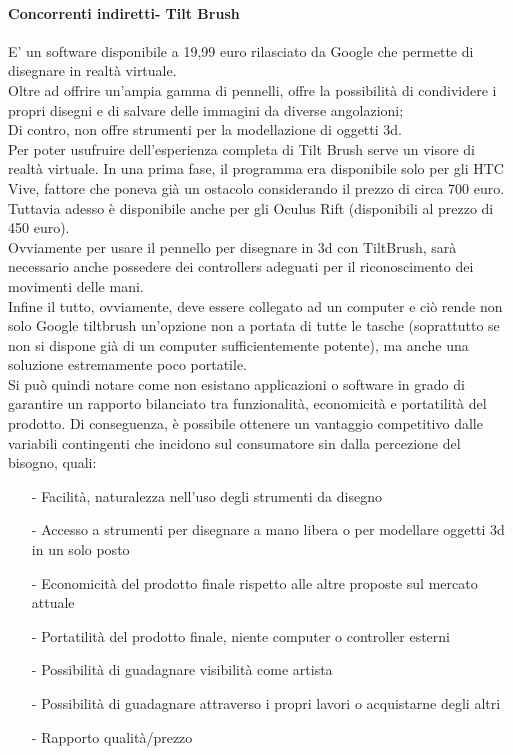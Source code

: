 \documentclass[11pt,fleqn]{book} %
\begin{document}
\paragraph{Concorrenti indiretti- Tilt Brush}
E' un software disponibile a 19,99 euro rilasciato da Google che permette di disegnare in realtà virtuale. \\
Oltre ad offrire un'ampia gamma di pennelli, offre la possibilità di condividere i propri disegni e di salvare delle immagini da diverse angolazioni; \\Di contro, non offre strumenti per la modellazione di oggetti 3d.\\
Per poter usufruire dell'esperienza completa di Tilt Brush serve un visore di realtà virtuale. In una prima fase, il programma era disponibile solo per gli HTC Vive, fattore che poneva già un ostacolo considerando il prezzo di circa 700  euro. Tuttavia adesso è disponibile anche per gli Oculus Rift (disponibili al prezzo di 450 euro). \\
Ovviamente per usare il pennello per disegnare in 3d con TiltBrush, sarà necessario anche possedere dei controllers adeguati per il riconoscimento dei movimenti delle mani.\\
Infine il tutto, ovviamente, deve essere collegato ad un computer e ciò rende non solo Google tiltbrush un'opzione non a portata di tutte le tasche (soprattutto se non si dispone già di un computer sufficientemente potente), ma anche una soluzione estremamente poco portatile.\\

Si può quindi notare come non esistano applicazioni o software in grado di garantire un rapporto bilanciato tra funzionalità, economicità e portatilità del prodotto. Di conseguenza, è possibile ottenere un vantaggio competitivo dalle variabili contingenti che incidono sul consumatore sin dalla percezione del bisogno, quali:
\begin{itemize}
\item[-] Facilità, naturalezza nell'uso degli strumenti da disegno
\item[-] Accesso a strumenti per disegnare a mano libera o per modellare oggetti 3d in un solo posto
\item[-] Economicità del prodotto finale rispetto alle altre proposte sul mercato attuale
\item[-] Portatilità del prodotto finale, niente computer o controller esterni
\item[-] Possibilità di guadagnare visibilità come artista 
\item[-] Possibilità di guadagnare attraverso i propri lavori o acquistarne degli altri
\item[-] Rapporto qualità/prezzo
\end{itemize}
\end{document}
